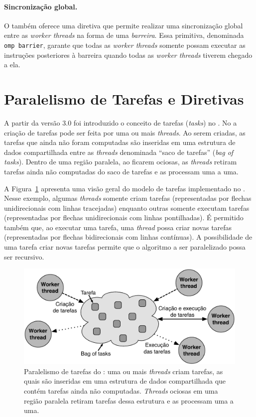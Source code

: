\documentclass{SBCbookchapter}
\begin{document}
		\paragraph{Sincronização global.} O \openmp também oferece uma diretiva que permite realizar uma
		sincronização global entre as \textit{worker threads} na forma de uma \textit{barreira}. Essa primitiva,
		denominada \texttt{omp barrier}, garante que todas as \textit{worker threads} somente possam executar
		as instruções posteriores à barreira quando todas as \textit{worker threads} tiverem chegado a ela.
	
\section{Paralelismo de Tarefas e Diretivas \openmp}
\label{sec:paralelismo tarefas}

	A partir da versão 3.0 foi introduzido o conceito de tarefas (\textit{tasks}) no \openmp.
	No \openmp a criação de tarefas pode ser feita por uma ou mais \textit{threads}. Ao
	serem criadas, as tarefas que ainda não foram computadas são inseridas em uma
	estrutura de dados compartilhada entre as \textit{threads} denominada ``saco de tarefas''
	(\textit{bag of tasks}). Dentro de uma região paralela, ao ficarem ociosas, as \textit{threads}
	retiram tarefas ainda não computadas do saco de tarefas e as processam uma a uma.
	
	A Figura~\ref{fig:tasks} apresenta uma visão geral do modelo de tarefas implementado
	no \openmp. Nesse exemplo, algumas \textit{threads} somente criam tarefas (representadas
	por flechas unidirecionais com linhas tracejadas) enquanto outras somente executam tarefas
	(representadas por flechas unidirecionais com linhas pontilhadas). É permitido também que,
	ao executar uma tarefa, uma \textit{thread} possa criar novas tarefas (representadas por
	flechas bidirecionais com linhas contínuas). A possibilidade de uma tarefa criar novas tarefas
	permite que o algoritmo a ser paralelizado possa ser recursivo.
	
		\begin{figure}[t]
			\centering
			\includegraphics[width=0.6\linewidth]{img/tasks}
			\caption{Paralelismo de tarefas do \openmp: uma ou mais \textit{threads} criam
			tarefas, as quais são inseridas em uma estrutura de dados compartilhada
			que contém tarefas ainda não computadas. \textit{Threads} ociosas em
			uma região paralela retiram tarefas dessa estrutura e as processam uma a
			uma.}
			\label{fig:tasks}
		\end{figure}
\end{document}
